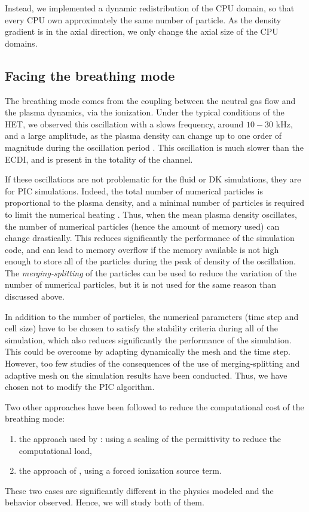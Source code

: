Instead, we implemented a dynamic redistribution of the CPU domain, so that every CPU own approximately the same number of particle.
As the density gradient is in the axial direction, we only change the axial size of the CPU domains.



\subsection{Facing the breathing mode} \label{subsec-breathmod}
The breathing mode comes from the coupling between the neutral gas flow and the plasma dynamics, via the ionization.
Under the typical conditions of the \ac{HET}, we observed this oscillation with a slows frequency, around  $10-30$ kHz, and a large amplitude, as the plasma density can change up to one order of magnitude during the oscillation period \citep{barral2003a,barral2009}.
This oscillation is much slower than the \ac{ECDI}, and is present in the totality of the channel.

If these oscillations are not problematic for the fluid or \ac{DK} simulations, they are for \ac{PIC} simulations.
Indeed, the total number of numerical particles is proportional to the plasma density, and a minimal number of particles is required to limit the numerical heating \citep{turner2006}.
Thus, when the mean plasma density oscillates, the number of numerical particles (hence the amount of memory used) can change drastically.
This reduces significantly the performance of the simulation code, and can lead to memory overflow if the memory available is not high enough to store all of the particles during the peak of density  of the oscillation.
The \emph{merging-splitting} of the particles  can be used to reduce the variation of the number of numerical particles, but it is not used for the same reason than discussed above.

In addition to the number of particles, the numerical parameters (time step and cell size) have to be chosen to satisfy the stability criteria during all of the simulation, which also reduces significantly the performance of the simulation. 
This could be overcome by adapting dynamically the mesh and the time step.
However, too few studies of the consequences of the use of merging-splitting and adaptive mesh on the simulation results have been conducted.
Thus, we have chosen not to modify the \ac{PIC} algorithm.


Two other approaches have been followed to reduce the computational cost of the breathing mode\string:
\begin{enumerate}
  \item the approach used by \citet{coche2014}\string: using a scaling of the permittivity to reduce the computational load,
  \item the approach of \citet{boeuf2017}, using a forced ionization source term.
\end{enumerate} 
These two cases are significantly different in the physics modeled and the behavior observed.
Hence, we will study both of them.

